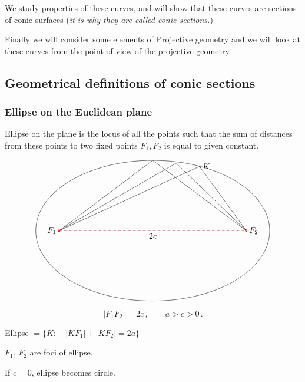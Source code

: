 \documentclass[12pt]{article}
\numberwithin{equation}{section}
\begin{document}
We study properties of these curves, and will show that
these curves are sections of conic surfaces
({\it it is why they are called conic sections.})

Finally we will consider some elements of Projective geometry
and we will look at these curves from the point of
view of the projective geometry.

  
\subsection {Geometrical definitions of conic sections}
 
  \subsubsection {Ellipse on the  Euclidean plane}

  Ellipse on the plane is the locus of all the points
such that the sum of distances from these points to
two fixed points $F_1,F_2$ is equal to given constant.

\bigskip
\begin{equation}\label{firstellipse}
\begin{tikzpicture}

\draw (0,0) ellipse  (5 and 3);

\draw  (-4,0)--(0,3)--(4,0);
\draw  (-4,0)--(1,82pt)--(4,0);
\draw  (-4,0)--(2,78pt)--(4,0);
\node 
[right] 
at (2,78pt) {$K$};

\draw [dashed, red] (-4,0) -- (4,0);
\node [below] at (0,0) {$2c$};

\draw[red,thick] (-4,0) circle (1pt); 
\draw[red,thick] (4,0) circle (1pt); 
\node [left] at (-4,0) {$F_1$};
\node [right] at (4,0) {$F_2$};
\end{tikzpicture}
\end{equation}
   
          $$
       |F_1F_2|=2c\,,\qquad a>c>0\,.
          $$
      

Ellipse $=\{K\colon\quad |KF_1|+|KF_2|=2a\}$

\m

    $F_1$, $F_2$ are foci of ellipse.


      


If $c=0$, ellipse becomes circle.



\end{document}

